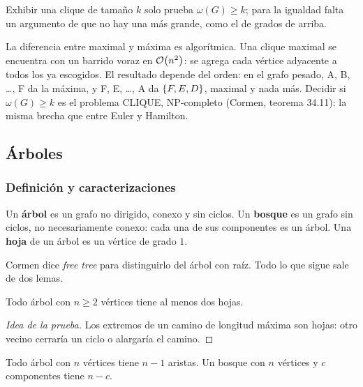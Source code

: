 \documentclass[11pt,letterpaper]{article}
\begin{document}
\begin{ojo}
  Exhibir una clique de tamaño $k$ solo prueba $\omega(G) \ge k$; para
  la igualdad falta un argumento de que no hay una más grande, como
  el de grados de arriba.
\end{ojo}

La diferencia entre maximal y máxima es algorítmica. Una clique
maximal se encuentra con un barrido voraz en $\mathcal{O}\!\left(n^2\right)$: se agrega
cada vértice adyacente a todos los ya escogidos. El resultado depende
del orden: en el grafo pesado, A, B, \dots, F da la máxima, y
F, E, \dots, A da $\left\{ F, E, D \right\}$, maximal y nada más.
Decidir si $\omega(G) \ge k$ es el problema CLIQUE, NP-completo
(Cormen, teorema 34.11): la misma brecha que entre Euler y Hamilton.


\subsection*{Árboles}

\subsubsection*{Definición y caracterizaciones}

\begin{definicion}
  \label{def:arbol}
  Un \textbf{árbol} es un grafo no dirigido, conexo y sin ciclos. Un
  \textbf{bosque} es un grafo sin ciclos, no necesariamente conexo:
  cada una de sus componentes es un árbol. Una \textbf{hoja} de un
  árbol es un vértice de grado $1$.
\end{definicion}

Cormen dice \textit{free tree} para distinguirlo del árbol con raíz.
Todo lo que sigue sale de dos lemas.

\begin{lema}[Hojas]
  \label{lem:arbol-hojas}
  Todo árbol con $n \ge 2$ vértices tiene al menos dos hojas.
\end{lema}

\begin{proof}[Idea de la prueba]
  Los extremos de un camino de longitud máxima son hojas: otro vecino
  cerraría un ciclo o alargaría el camino.
\end{proof}

\begin{lema}[Aristas]
  \label{lem:arbol-aristas}
  Todo árbol con $n$ vértices tiene $n - 1$ aristas. Un bosque con
  $n$ vértices y $c$ componentes tiene $n - c$.
\end{lema}
\end{document}
